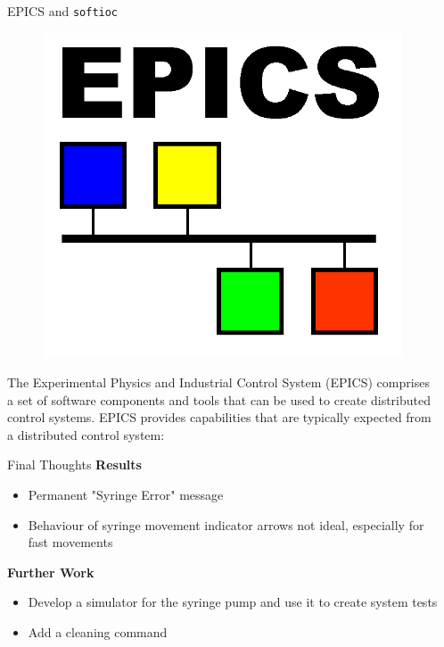 \documentclass[final,t]{beamer}
\begin{document}
\begin{frame}
\begin{columns}[t]
\begin{column}{.32\linewidth}
  \end{column}

  

  \begin{column}{.32\linewidth}

      \begin{custombox}{EPICS and \texttt{softioc}}
          \begin{figure}
      \includegraphics[width=\linewidth]{images/epicslogo}
          \end{figure}
      The Experimental Physics and Industrial Control System (EPICS) comprises a set of software components and
      tools that can be used to create distributed control systems. EPICS provides capabilities that are typically expected from a distributed control system:
  \end{custombox}

 
  \begin{custombox}{Final Thoughts}
      \textbf{Results} 
    \begin{itemize}
        \item Permanent "Syringe Error" message 
        \item Behaviour of syringe movement indicator arrows not ideal, especially for fast movements 
    \end{itemize}

      \textbf{Further Work }
    \begin{itemize}
        \item Develop a simulator for the syringe pump and use it to create system tests
        \item Add a cleaning command 
    \end{itemize}
  \end{custombox}

  \end{column}
  \end{columns}
    
\end{frame}
\end{document}
